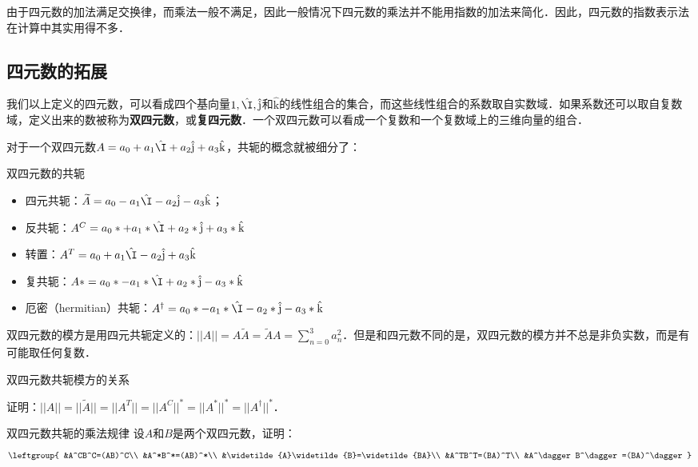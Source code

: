 由于四元数的加法满足交换律，而乘法一般不满足，因此一般情况下四元数的乘法并不能用指数的加法来简化．因此，四元数的指数表示法在计算中其实用得不多．

\subsection{四元数的拓展}

我们以上定义的四元数，可以看成四个基向量$1, \hat{\I}, \hat{\mathrm{j}}$和$\hat{\mathrm{k}}$的线性组合的集合，而这些线性组合的系数取自实数域．如果系数还可以取自复数域，定义出来的数被称为\textbf{双四元数}，或\textbf{复四元数}．一个双四元数可以看成一个复数和一个复数域上的三维向量的组合．

对于一个双四元数$A=a_0+a_1\hat{\I}+a_2\hat{\mathrm{j}}+a_3\hat{\mathrm{k}}$，共轭的概念就被细分了：

\begin{definition}{双四元数的共轭}
\begin{itemize}

\item 四元共轭：$\widetilde{A}=a_0-a_1\hat{\I}-a_2\hat{\mathrm{j}}-a_3\hat{\mathrm{k}}$；
\item 反共轭：$A^C=a_0*+a_1*\hat{\I}+a_2*\hat{\mathrm{j}}+a_3*\hat{\mathrm{k}}$
\item 转置：$A^T=a_0+a_1\hat{\I}-a_2\hat{\mathrm{j}}+a_3\hat{\mathrm{k}}$
\item 复共轭：$A*=a_0*-a_1*\hat{\I}+a_2*\hat{\mathrm{j}}-a_3*\hat{\mathrm{k}}$
\item 厄密（hermitian）共轭：$A^\dagger=a_0*-a_1*\hat{\I}-a_2*\hat{\mathrm{j}}-a_3*\hat{\mathrm{k}}$

\end{itemize}
\end{definition}

双四元数的模方是用四元共轭定义的：$||A||=A\widetilde{A}=\widetilde{A}A=\sum^{3}_{n=0}a^2_n$．但是和四元数不同的是，双四元数的模方并不总是非负实数，而是有可能取任何复数．

\begin{exercise}{双四元数共轭模方的关系}

证明：$||A||=||\widetilde{A}||=||A^T||=||A^C||^*=||A^*||^*=||A^\dagger||^*$．

\end{exercise}

\begin{exercise}{双四元数共轭的乘法规律}
设$A$和$B$是两个双四元数，证明：
\begin{equation}
\leftgroup{
&A^CB^C=(AB)^C\\
&A^*B^*=(AB)^*\\
&\widetilde{A}\widetilde{B}=\widetilde{BA}\\
&A^TB^T=(BA)^T\\
&A^\dagger B^\dagger=(BA)^\dagger
}
\end{equation}

\end{exercise}

